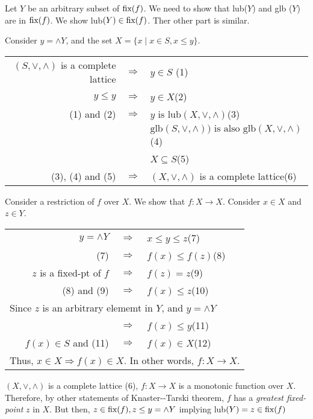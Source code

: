 \documentclass[12pt]{article}
\newcommand{\answer}[1]{{{\blue #1}}}
\begin{document}
\answer{ 
    Let $Y$ be an arbitrary subset of $\mbox{\rm fix}(f)$.  We
    need to show that lub($Y$) and glb ($Y$) are in
    $\mbox{\rm fix}(f)$. We show lub$(Y) \in \mbox{\rm
      fix}(f)$. Ther other part is similar.

    Consider $y = \wedge Y$, and the set
    $X = \{ x \mid x \in S, x \leq y\}$.  
    \begin{center}
      \begin{tabular}[t]{rcp{.6\textwidth}}
        $(S,\vee,\wedge)$ is a complete lattice &$\Rightarrow$& $y \in S$  \dotfill(1) \\
        $y \leq y$ &$\Rightarrow$ & $y \in X$\dotfill(2) \\
        (1) and (2) &$\Rightarrow$ & $y \mbox{ is lub}(X,\vee,\wedge)$\dotfill(3)\\
        && $\mbox{glb}(S,\vee,\wedge)) \mbox{ is also glb}(X,\vee,\wedge)$\dotfill(4)\\
        && $X \subseteq S$\dotfill(5)\\
        (3), (4) and (5) &$\Rightarrow$ & $(X,\vee,\wedge)$ is a complete lattice\dotfill(6)\\

      \end{tabular}
    \end{center}

    Consider a restriction of $f$ over $X$. We show that $f: X \rightarrow X$. Consider $x \in X$ and $z \in Y$.
    \begin{center}
      \begin{tabular}[t]{rcp{.6\textwidth}}
        $y = \wedge Y$ &$\Rightarrow$& $x \leq y \leq z$\dotfill(7)\\
        (7) &$\Rightarrow$& $f(x) \leq f(z)$\dotfill(8)\\
        $z$ is a fixed-pt of $f$ & $\Rightarrow$ & $f(z) = z$\dotfill(9)\\
        (8) and (9) & $\Rightarrow$ & $f(x) \leq z$\dotfill(10)\\
        \multicolumn{3}{l}{Since $z$ is an arbitrary elememt in $Y$, and $y = \wedge Y$}\\
        &$\Rightarrow$ & $f(x) \leq y$\dotfill(11) \\
        $f(x) \in S$ and (11) &$\Rightarrow$ & $f(x) \in X$\dotfill(12)\\
        \multicolumn{3}{l}{Thus, $x \in X \Rightarrow f(x) \in X$. In other words, $f: X \rightarrow X$.}
      \end{tabular}
    \end{center}

    $(X,\vee,\wedge)$    is     a    complete     lattice    (6),
    $f:   X  \rightarrow   X$  is   a  monotonic   function  over
    $X$.  Therefore,  by   other  statements  of  Knaster-‐Tarski
    theorem, $f$ has a {\em greatest fixed-point} $z$ in $X$. But
    then, $z \in \mbox{\rm fix}(f), z \leq y = \wedge Y$ implying
    lub$(Y) = z \in \mbox{\rm fix}(f)$
        
}
\end{document}
